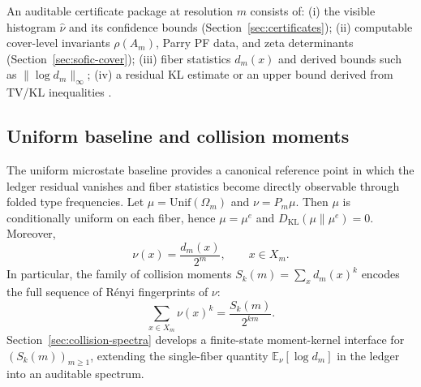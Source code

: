 \begin{remark}\label{rem:ledger-certificates}
An auditable certificate package at resolution $m$ consists of:
(i) the visible histogram $\hat{\nu}$ and its confidence bounds (Section~\ref{sec:certificates});
(ii) computable cover-level invariants $\rho(A_m)$, Parry PF data, and zeta determinants (Section~\ref{sec:sofic-cover});
(iii) fiber statistics $d_m(x)$ and derived bounds such as $\|\log d_m\|_\infty$;
(iv) a residual KL estimate or an upper bound derived from TV/KL inequalities \cite{SasonVerdu2016fDivergence}.
\end{remark}

\subsection{Uniform baseline and collision moments}\label{subsec:ledger-collision}
The uniform microstate baseline provides a canonical reference point in which the ledger residual vanishes and fiber statistics become directly observable through folded type frequencies.
Let $\mu=\mathrm{Unif}(\Omega_m)$ and $\nu=P_m\mu$.
Then $\mu$ is conditionally uniform on each fiber, hence $\mu=\mu^e$ and $D_{\mathrm{KL}}(\mu\|\mu^e)=0$.
Moreover,
\[
\nu(x)=\frac{d_m(x)}{2^m},
\qquad x\in X_m.
\]
In particular, the family of collision moments
\(
S_k(m)=\sum_x d_m(x)^k
\)
encodes the full sequence of R\'enyi fingerprints of $\nu$:
\[
\sum_{x\in X_m}\nu(x)^k=\frac{S_k(m)}{2^{km}}.
\]
Section~\ref{sec:collision-spectra} develops a finite-state moment-kernel interface for $(S_k(m))_{m\ge 1}$, extending the single-fiber quantity $\mathbb{E}_\nu[\log d_m]$ in the ledger into an auditable spectrum.

